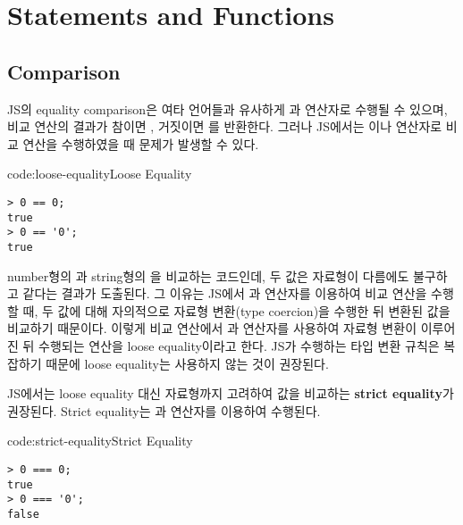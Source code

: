 \section{Statements and Functions} \label{sect:statements-and-functions}

\subsection*{Comparison}

JS의 equality comparison은 여타 언어들과 유사하게 \cd{==}과 \cd{!=} 연산자로 수행될 수 있으며, 비교 연산의 결과가 참이면 , 거짓이면 를 반환한다. 그러나 JS에서는 \cd{==}이나 \cd{!=} 연산자로 비교 연산을 수행하였을 때 문제가 발생할 수 있다.

\begin{codeenv}{code:loose-equality}{Loose Equality}\begin{verbatim}
> 0 == 0;
true
> 0 == '0';
true
\end{verbatim}
\end{codeenv}

\는 number형의 과 string형의 을 비교하는 코드인데, 두 값은 자료형이 다름에도 불구하고 같다는 결과가 도출된다. 그 이유는 JS에서 \cd{==}과 \cd{!=} 연산자를 이용하여 비교 연산을 수행할 때, 두 값에 대해 자의적으로 자료형 변환(type coercion)을 수행한 뒤 변환된 값을 비교하기 때문이다. 이렇게 비교 연산에서 \cd{==}과 \cd{!=} 연산자를 사용하여 자료형 변환이 이루어진 뒤 수행되는 연산을 loose equality이라고 한다. JS가 수행하는 타입 변환 규칙은 복잡하기 때문에 loose equality는 사용하지 않는 것이 권장된다.


JS에서는 loose equality 대신 자료형까지 고려하여 값을 비교하는 \textbf{strict equality}가 권장된다. Strict equality는 \cd{===}과 \cd{!==} 연산자를 이용하여 수행된다.

\begin{codeenv}{code:strict-equality}{Strict Equality}\begin{verbatim}
> 0 === 0;
true
> 0 === '0';
false
\end{verbatim}
\end{codeenv}
\newpage

